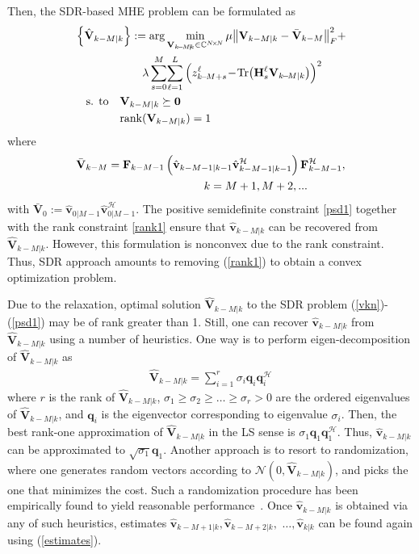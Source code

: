 \documentclass[conference]{IEEEtran}
\def\ccalH{{\ensuremath{\mathcal H}}}
\def\ccalN{{\ensuremath{\mathcal N}}}
\def\bbF{{\ensuremath{\mathbf F}}}
\def\bbH{{\ensuremath{\mathbf H}}}
\def\bbV{{\ensuremath{\mathbf V}}}
\def\bbq{{\ensuremath{\mathbf q}}}
\def\bbv{{\ensuremath{\mathbf v}}}
\def\bb0{{\ensuremath{\mathbf 0}}}
\begin{document}
Then, the SDR-based MHE problem can be formulated as
\begin{subequations}
\begin{align}
&\left\{\hat\bbV_{k-M|k}\right\}:={\rm{arg}}\mathop{\rm{min}}
\limits_{\bbV_{k\!-\!M\!|\!k}\in\mathbb{C}^{N\!\times\! N}}\mu \big\|\bbV_{k-M|k}-\bar\bbV_{k-M}\big\|_F^2+\nonumber\\
&\qquad\qquad\qquad\lambda\sum_{s=0}^{M}\!\sum_{\ell=1}^{L}\Big(z_{k\!-\!M+s}^\ell\!-\!{\rm{Tr}}
\big(\bbH_{s}^\ell\bbV_{k\!-\!M|k}\big)\Big)^2\label{vkn}\\
&\quad{\text{s. to}}\quad \bbV_{k-M|k}\succeq \bb0 \label{psd1}\\
&\quad\quad\quad\quad{\rm{rank}}(\bbV_{k-M|k})=1\label{rank1}
\end{align}
\end{subequations}
where
\begin{align}
&\bar\bbV_{k-M} = \bbF_{k-M-1} \left(\hat{\bbv}_{k-M-1|k-1} \hat{\bbv}_{k-M-1|k-1}^\ccalH\right)\bbF_{k-M-1}^\ccalH, \nonumber\\
& \hspace{40mm} k = M+1,M+2,...
 \end{align}
with $\bar \bbV_0 := \hat \bbv_{0|M-1} \hat \bbv_{0|M-1}^\ccalH$. The positive semidefinite constraint \eqref{psd1} together with the rank constraint \eqref{rank1} ensure that $\hat\bbv_{k-M|k}$ can be recovered from $\hat\bbV_{k-M|k}$. However, this formulation is nonconvex due to the rank constraint. Thus, SDR approach amounts to removing (\ref{rank1}) to obtain a convex optimization problem.

Due to the relaxation, optimal solution $\hat\bbV_{k-M|k}$ to the SDR problem (\ref{vkn})-(\ref{psd1}) may be of rank greater than 1. Still, one can recover  $\hat\bbv_{k-M|k}$ from $\hat\bbV_{k-M|k}$ using a number of heuristics. One way is to perform eigen-decomposition of $\hat\bbV_{k-M|k}$ as
 \begin{align}
 \hat\bbV_{k-M|k}=\sum_{i=1}^r\sigma_i\bbq_i\bbq_i^\ccalH
 \end{align}
where $r$ is the rank of $\hat\bbV_{k-M|k}$, $\sigma_1\ge\sigma_2\ge\ldots\ge\sigma_r > 0$ are the ordered eigenvalues of $\hat\bbV_{k-M|k}$, and $\bbq_i$ is the eigenvector corresponding to  eigenvalue $\sigma_i$. Then, the best rank-one approximation of $\hat\bbV_{k-M|k}$ in the LS sense is $\sigma_1\bbq_1\bbq_1^\ccalH$. Thus, $\hat \bbv_{k-M|k}$ can be approximated to $\sqrt{\sigma_1}\bbq_1$.
Another approach is to resort to randomization, where one generates random vectors according to $\ccalN(0,\hat{\bbV}_{k-M|k})$, and picks the one that minimizes the cost.
Such a randomization procedure has been empirically found to yield reasonable performance~\cite{spm:luo2010}. Once $\hat\bbv_{k-M|k}$ is obtained via any of such heuristics, estimates $\hat\bbv_{k-M+1|k},\hat\bbv_{k-M+2|k},$ $\ldots,\hat\bbv_{k|k}$ can be found again using (\ref{estimates}).
\end{document}
